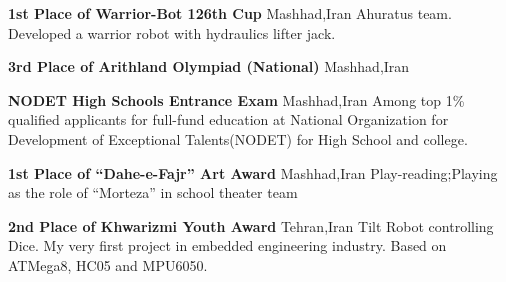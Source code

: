 {\textbf{1st Place of Warrior-Bot 126th Cup }}
{Mashhad,Iran}
{}
{}
{
   Ahuratus team. Developed a warrior robot with hydraulics lifter jack.
}


{\textbf{3rd Place of Arithland Olympiad (National) }}
{Mashhad,Iran}
{}
{}
{}

{\textbf{NODET High Schools Entrance Exam}}
{Mashhad,Iran}
{}
{}
{
Among top 1\% qualified applicants for full-fund education at National Organization for Development of Exceptional Talents(NODET) for High School and college.
}

{\textbf{1st Place of “Dahe-e-Fajr” Art Award }}
{Mashhad,Iran}
{}
{}
{
	Play-reading;Playing as the role of “Morteza” in school theater team
}

{\textbf{2nd Place of Khwarizmi Youth Award }}
{Tehran,Iran}
{}{}
{
	Tilt Robot controlling Dice. My very first project in embedded engineering industry. Based on ATMega8, HC05 and MPU6050. 
}